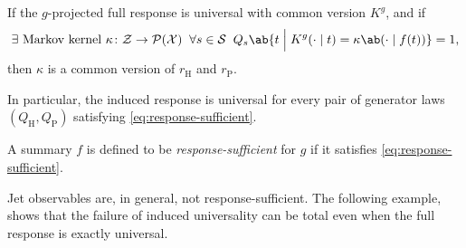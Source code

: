 \documentclass[12pt]{article}
\newcommand{\Herwig}{\mathrm{H}}
\newcommand{\Pythia}{\mathrm{P}}
\newcommand{\Gens}{\mathcal{S}}
\newcommand{\Meas}{\mathcal{P}}
\newcommand{\1}{\mathbbm{1}}
\renewcommand{\[}{\begin{equation}}
\renewcommand{\]}{\end{equation}}
\begin{document}
\begin{proposition}
    \label{prop:sufficient}
        If the \(g\)-projected full response is universal with common version \(K^g\), and if 
        \[
        \label{eq:response-sufficient}
            \exists \text{ Markov kernel } \kappa \colon \mathcal Z \to \Meas(\mathcal X) \;\; \forall s \in \Gens \;\; Q_s \ab\{ t \; \Big| \; K^g(\cdot\mid t)=\kappa\ab( \cdot \mid f(t))\} = 1,
        \]
        then \(\kappa\) is a common version of \(r_\Herwig\) and \(r_\Pythia\).
        
        In particular, the induced response is universal for every pair of generator laws \((Q_\Herwig,Q_\Pythia)\) satisfying \cref{eq:response-sufficient}.
    \end{proposition}

    \begin{definition}  A summary \(f\) is defined to be \emph{response-sufficient} for \(g\) if it satisfies \cref{eq:response-sufficient}.
        
    \end{definition}

    Jet observables are, in general, not response-sufficient.
    The following example, shows that the failure of induced universality can be total even when the full response is exactly universal.
\end{document}

